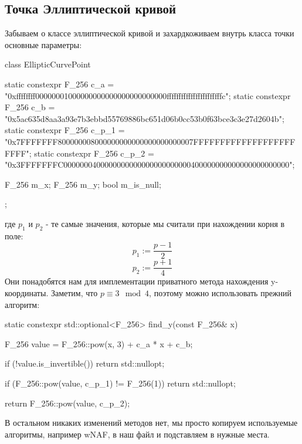 \subsection{Точка Эллиптической кривой}
Забываем о классе эллиптической кривой и захардкоживаем внутрь класса точки основные параметры:
\begin{cppcode}
class EllipticCurvePoint {
    static constexpr F_256 c_a = "0xffffffff00000001000000000000000000000000fffffffffffffffffffffffc";
    static constexpr F_256 c_b = "0x5ac635d8aa3a93e7b3ebbd55769886bc651d06b0cc53b0f63bce3c3e27d2604b";
    static constexpr F_256 c_p_1 = "0x7FFFFFFF800000008000000000000000000000007FFFFFFFFFFFFFFFFFFFFFFF";
    static constexpr F_256 c_p_2 = "0x3FFFFFFFC0000000400000000000000000000000400000000000000000000000";

    F_256 m_x;
    F_256 m_y;
    bool m_is_null;
};
\end{cppcode}
где $p_1$ и $p_2$ - те самые значения, которые мы считали при нахождении корня в поле:
\[p_1:=\frac{p-1}{2}\]
\[p_2:=\frac{p+1}{4}\]
Они понадобятся нам для имплементации приватного метода нахождения y-координаты. Заметим, что $p\equiv 3\mod 4$, поэтому можно использовать прежний алгоритм:
\begin{cppcode}
static constexpr std::optional<F_256> find_y(const F_256& x) {
    F_256 value = F_256::pow(x, 3) + c_a * x + c_b;

    if (!value.is_invertible()) {
        return std::nullopt;
    }

    if (F_256::pow(value, c_p_1) != F_256(1)) {
        return std::nullopt;
    }

    return F_256::pow(value, c_p_2);
}
\end{cppcode}
В остальном никаких изменений методов нет, мы просто копируем используемые алгоритмы, например wNAF, в наш файл и подставляем в нужные места.
